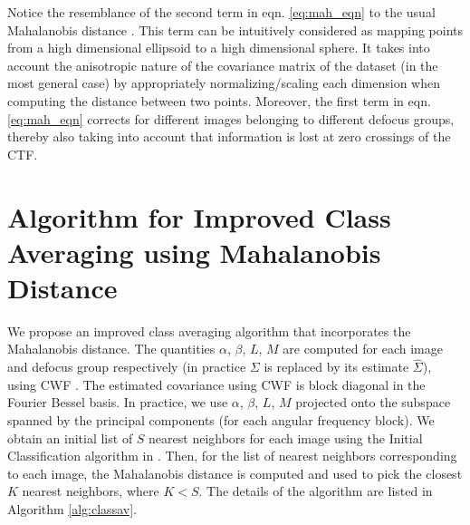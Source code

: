 \documentclass{article}
\begin{document}
Notice the resemblance of the second term in eqn. \ref{eq:mah_eqn} to the usual Mahalanobis distance \cite{mah}. This term can be intuitively considered as mapping points from a high dimensional ellipsoid to a high dimensional sphere. It takes into account the anisotropic nature of the covariance matrix of the dataset (in the most general case) by appropriately normalizing/scaling each dimension when computing the distance between two points. Moreover, the first term in eqn. \ref{eq:mah_eqn} corrects for different images belonging to different defocus groups, thereby also taking into account that information is lost at zero crossings of the CTF.

\section{Algorithm for Improved Class Averaging using Mahalanobis Distance}

We propose an improved class averaging algorithm that incorporates the Mahalanobis distance. The quantities $\alpha$, $\beta$, $L$, $M$ are computed for each image and defocus group respectively (in practice $\Sigma$ is replaced by its estimate $\hat{\Sigma}$), using CWF \cite{cwf}. The estimated covariance using CWF is block diagonal in the Fourier Bessel basis. In practice, we use $\alpha$, $\beta$, $L$, $M$ projected onto the subspace spanned by the principal components (for each angular frequency block). We obtain an initial list of $S$ nearest neighbors for each image using the Initial Classification algorithm in \cite{zhao1}. Then, for the list of nearest neighbors corresponding to each image, the Mahalanobis distance is computed and used to pick the closest $K$ nearest neighbors, where $K<S$. The details of the algorithm are listed in Algorithm \ref{alg:classav}. 
\end{document}
